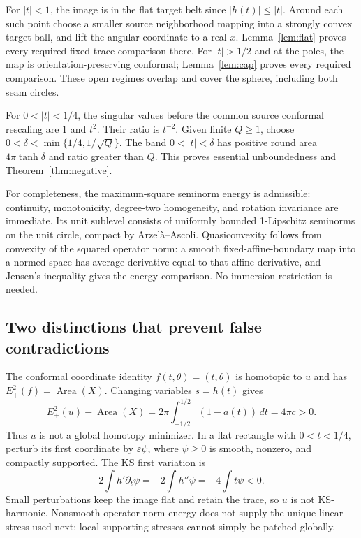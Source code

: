 \documentclass[11pt]{article}
\newcommand{\Ep}{E_+^2}
\begin{document}
For $|t|<1$, the image is in the flat target belt since $|h(t)|\le|t|$.
Around each such point choose a smaller source neighborhood mapping into a
strongly convex target ball, and lift the angular coordinate to a real $x$.
Lemma~\ref{lem:flat} proves every required fixed-trace comparison there.
For $|t|>1/2$ and at the poles, the map is orientation-preserving conformal;
Lemma~\ref{lem:cap} proves every required comparison. These open regimes
overlap and cover the sphere, including both seam circles.

For $0<|t|<1/4$, the singular values before the common source conformal
rescaling are $1$ and $t^2$. Their ratio is $t^{-2}$. Given finite $Q\ge1$,
choose $0<\delta<\min\{1/4,1/\sqrt Q\}$. The band $0<|t|<\delta$ has
positive round area $4\pi\tanh\delta$ and ratio greater than $Q$.
This proves essential unboundedness and Theorem~\ref{thm:negative}.

For completeness, the maximum-square seminorm energy is admissible: continuity,
monotonicity, degree-two homogeneity, and rotation invariance are immediate.
Its unit sublevel consists of uniformly bounded 1-Lipschitz seminorms on the
unit circle, compact by Arzel\`a--Ascoli. Quasiconvexity follows from convexity
of the squared operator norm: a smooth fixed-affine-boundary map into a normed
space has average derivative equal to that affine derivative, and Jensen's
inequality gives the energy comparison. No immersion restriction is needed.

\subsection*{Two distinctions that prevent false contradictions}
The conformal coordinate identity $f(t,\theta)=(t,\theta)$ is homotopic to $u$
and has $\Ep(f)=\operatorname{Area}(X)$. Changing variables $s=h(t)$ gives
\[
 \Ep(u)-\operatorname{Area}(X)
 =2\pi\int_{-1/2}^{1/2}(1-a(t))\,dt=4\pi c>0.
\]
Thus $u$ is not a global homotopy minimizer. In a flat rectangle with
$0<t<1/4$, perturb its first coordinate by $\varepsilon\psi$, where
$\psi\ge0$ is smooth, nonzero, and compactly supported. The KS first variation is
\[
 2\int h'\partial_t\psi=-2\int h''\psi=-4\int t\psi<0.
\]
Small perturbations keep the image flat and retain the trace, so $u$ is not
KS-harmonic. Nonsmooth operator-norm energy does not supply the unique linear
stress used next; local supporting stresses cannot simply be patched globally.
\end{document}
